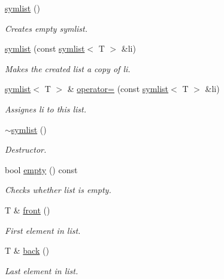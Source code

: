 \begin{DoxyCompactItemize}
\item 
\mbox{\hyperlink{classsymlist_a678dc0ddb02994195a2359a361ee0ea6}{symlist}} ()
\begin{DoxyCompactList}\small\item\em Creates empty symlist. \end{DoxyCompactList}\item 
\mbox{\hyperlink{classsymlist_a5c17d54592dac03b2c4d940a10153797}{symlist}} (const \mbox{\hyperlink{classsymlist}{symlist}}$<$ T $>$ \&li)
\begin{DoxyCompactList}\small\item\em Makes the created list a copy of {\ttfamily li}. \end{DoxyCompactList}\item 
\mbox{\hyperlink{classsymlist}{symlist}}$<$ T $>$ \& \mbox{\hyperlink{classsymlist_aab326eda0f6d3a78f193a249342670bc}{operator=}} (const \mbox{\hyperlink{classsymlist}{symlist}}$<$ T $>$ \&li)
\begin{DoxyCompactList}\small\item\em Assignes {\ttfamily li} to this list. \end{DoxyCompactList}\item 
\mbox{\hyperlink{classsymlist_a45c3a0b7f0e996998037fb876effefd4}{$\sim$symlist}} ()
\begin{DoxyCompactList}\small\item\em Destructor. \end{DoxyCompactList}\item 
bool \mbox{\hyperlink{classsymlist_aca11cd6c621376bc52a18828ef92e753}{empty}} () const
\begin{DoxyCompactList}\small\item\em Checks whether list is empty. \end{DoxyCompactList}\item 
T \& \mbox{\hyperlink{classsymlist_afd4b55616fc20033d4a47684551866e8}{front}} ()
\begin{DoxyCompactList}\small\item\em First element in list. \end{DoxyCompactList}\item 
T \& \mbox{\hyperlink{classsymlist_abc0570ff78ded9210ac26865519d36e3}{back}} ()
\begin{DoxyCompactList}\small\item\em Last element in list. \end{DoxyCompactList}\item 

\end{DoxyCompactItemize}
